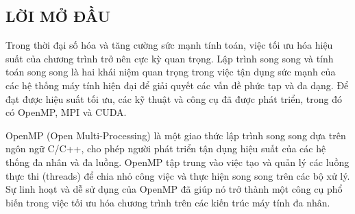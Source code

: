 \documentclass[14pt, a4paper]{article}
\numberwithin{equation}{section}
\numberwithin{figure}{section}
\numberwithin{dl}{section}
\numberwithin{md}{section}
\numberwithin{bd}{section}
\numberwithin{dn}{section}
\numberwithin{hq}{section}
\begin{document}
\begin{titlepage}




    \vfill %

\end{titlepage}


\cleardoublepage
{}
\tableofcontents
\newpage
\listoffigures
\newpage
\glsaddall 
\renewcommand*{\glossaryname}{Danh mục các từ viết tắt}
\renewcommand*{\acronymname}{Danh sách từ viết tắt}
\renewcommand*{\entryname}{Viết tắt}
\renewcommand*{\descriptionname}{Viết đầy đủ}
\printnoidxglossary
\cleardoublepage
{}


\newpage

\nocite{*}

\begin{center}
\section*{LỜI MỞ ĐẦU}
\end{center}

Trong thời đại số hóa và tăng cường sức mạnh tính toán, việc tối ưu hóa hiệu suất của chương trình trở nên cực kỳ quan trọng. Lập trình song song và tính toán song song là hai khái niệm quan trọng trong việc tận dụng sức mạnh của các hệ thống máy tính hiện đại để giải quyết các vấn đề phức tạp và đa dạng. Để đạt được hiệu suất tối ưu, các kỹ thuật và công cụ đã được phát triển, trong đó có OpenMP, MPI và CUDA.

OpenMP (Open Multi-Processing) là một giao thức lập trình song song dựa trên ngôn ngữ C/C++, cho phép người phát triển tận dụng hiệu suất của các hệ thống đa nhân và đa luồng. OpenMP tập trung vào việc tạo và quản lý các luồng thực thi (threads) để chia nhỏ công việc và thực hiện song song trên các bộ xử lý. Sự linh hoạt và dễ sử dụng của OpenMP đã giúp nó trở thành một công cụ phổ biến trong việc tối ưu hóa chương trình trên các kiến trúc máy tính đa nhân.
\end{document}
